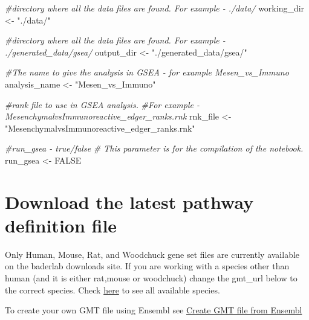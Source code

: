 \documentclass[
]{book}
\newenvironment{Shaded}{\begin{snugshade}}{\end{snugshade}}
\newcommand{\CommentTok}[1]{\textcolor[rgb]{0.56,0.35,0.01}{\textit{#1}}}
\newcommand{\ConstantTok}[1]{\textcolor[rgb]{0.00,0.00,0.00}{#1}}
\newcommand{\NormalTok}[1]{#1}
\newcommand{\OtherTok}[1]{\textcolor[rgb]{0.56,0.35,0.01}{#1}}
\newcommand{\StringTok}[1]{\textcolor[rgb]{0.31,0.60,0.02}{#1}}
\begin{document}
\begin{Shaded}
\begin{Highlighting}[]
\CommentTok{\#directory where all the data files are found.  For example {-}   ./data/ }
\NormalTok{working\_dir }\OtherTok{\textless{}{-}} \StringTok{"./data/"}

\CommentTok{\#directory where all the data files are found.  For example {-}   ./generated\_data/gsea/}
\NormalTok{output\_dir }\OtherTok{\textless{}{-}} \StringTok{"./generated\_data/gsea/"}

\CommentTok{\#The name to give the analysis in GSEA {-} for example Mesen\_vs\_Immuno}
\NormalTok{analysis\_name }\OtherTok{\textless{}{-}} \StringTok{"Mesen\_vs\_Immuno"}

\CommentTok{\#rank file to use in GSEA analysis.  }
\CommentTok{\#For example {-} MesenchymalvsImmunoreactive\_edger\_ranks.rnk}
\NormalTok{rnk\_file }\OtherTok{\textless{}{-}} \StringTok{"MesenchymalvsImmunoreactive\_edger\_ranks.rnk"}

\CommentTok{\#run\_gsea {-} true/false}
\CommentTok{\# This parameter is for the compilation of the notebook.  }
\NormalTok{run\_gsea }\OtherTok{\textless{}{-}} \ConstantTok{FALSE}
\end{Highlighting}
\end{Shaded}

\hypertarget{download-the-latest-pathway-definition-file}{%
\section{Download the latest pathway definition file}\label{download-the-latest-pathway-definition-file}}

Only Human, Mouse, Rat, and Woodchuck gene set files are currently available on the baderlab downloads site. If you are working with a species other than human (and it is either rat,mouse or woodchuck) change the gmt\_url below to the correct species. Check \href{http://download.baderlab.org/EM_Genesets/current_release/}{here} to see all available species.

To create your own GMT file using Ensembl see \protect\hyperlink{create-gmt-file-from-ensembl}{Create GMT file from Ensembl}
\end{document}
